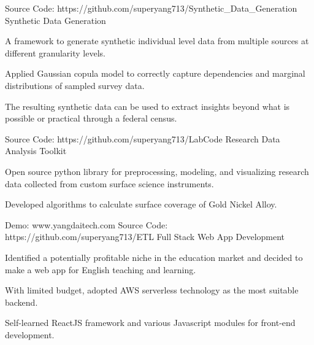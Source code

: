 


\begin{cventries}


\cventry
{Source Code: https://github.com/superyang713/Synthetic\_Data\_Generation}
{Synthetic Data Generation}
{}
{}
{
\begin{cvitems}
\item {A framework to generate synthetic individual level data from
    multiple sources at different granularity levels.}
\item {Applied Gaussian copula model to correctly capture dependencies and
    marginal distributions of sampled survey data.}
\item {The resulting synthetic data can be used to extract insights beyond what
    is possible or practical through a federal census.}
\end{cvitems}
}


\cventry
{Source Code: https://github.com/superyang713/LabCode}
{Research Data Analysis Toolkit}
{}
{}
{
\begin{cvitems}
\item {Open source python library for preprocessing, modeling, and visualizing
    research data collected from custom surface science instruments.}
\item {Developed algorithms to calculate surface coverage of Gold Nickel Alloy.}
\end{cvitems}
}


\cventry
{Demo: www.yangdaitech.com   Source Code: https://github.com/superyang713/ETL}
{Full Stack Web App Development}
{}
{}
{
\begin{cvitems}
\item {Identified a potentially profitable niche in the education market and
    decided to make a web app for English teaching and learning.}
\item {With limited budget, adopted AWS serverless technology as the most
    suitable backend.}
\item {Self-learned ReactJS framework and various Javascript modules for
    front-end development.}
\end{cvitems}
}


\end{cventries}


